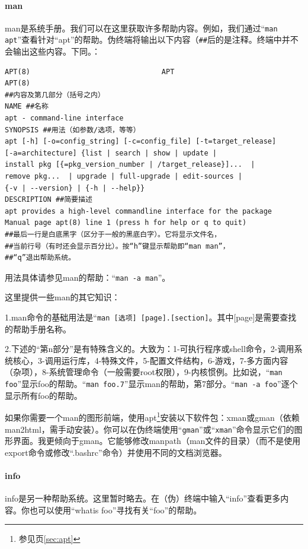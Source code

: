 \paragraph{man}
man是系统手册。我们可以在这里获取许多帮助内容。例如，我们通过“\verb|man apt|”查看针对“apt”的帮助。伪终端将输出以下内容（\verb|##|后的是注释。终端中并不会输出这些内容。下同。：
\begin{verbatim}
APT(8)                               APT                              APT(8)
##内容及第几部分（括号之内）
NAME ##名称
apt - command-line interface
SYNOPSIS ##用法（如参数/选项，等等）
apt [-h] [-o=config_string] [-c=config_file] [-t=target_release]
[-a=architecture] {list | search | show | update |
install pkg [{=pkg_version_number | /target_release}]...  |
remove pkg...  | upgrade | full-upgrade | edit-sources |
{-v | --version} | {-h | --help}}
DESCRIPTION ##简要描述
apt provides a high-level commandline interface for the package
Manual page apt(8) line 1 (press h for help or q to quit)
##最后一行是白底黑字（区分于一般的黑底白字）。它将显示文件名，
##当前行号（有时还会显示百分比）。按“h”键显示帮助即“man man”，
##“q”退出帮助系统。
\end{verbatim}
用法具体请参见man的帮助：“\verb|man -a man|”。\par 这里提供一些man的其它知识：\par 1.man命令的基础用法是“\verb|man [选项] [page].[section]|。其中[page]是需要查找的帮助手册名称。\par 2.下述的“第n部分”是有特殊含义的。大致为：1-可执行程序或shell命令，2-调用系统核心，3-调用运行库，4-特殊文件，5-配置文件结构，6-游戏，7-多方面内容（杂项），8-系统管理命令（一般需要root权限），9-内核惯例。比如说，“\verb|man foo|”显示foo的帮助。“\verb|man foo.7|”显示man的帮助，第7部分。“\verb|man -a foo|”逐个显示所有foo的帮助。\par
如果你需要一个man的图形前端，使用apt\footnote{参见\pageref{sec:apt}页\ref{sec:apt}}安装以下软件包：xman或gman（依赖man2html，需手动安装）。你可以在伪终端使用“\verb|gman|”或“\verb|xman|”命令显示它们的图形界面。我更倾向于gman。它能够修改manpath（man文件的目录）（而不是使用export命令或修改“.bashrc”命令）并使用不同的文档浏览器。
\paragraph{info}
info是另一种帮助系统。这里暂时略去。在（伪）终端中输入“info”查看更多内容。你也可以使用“whatis foo”寻找有关“foo”的帮助。
